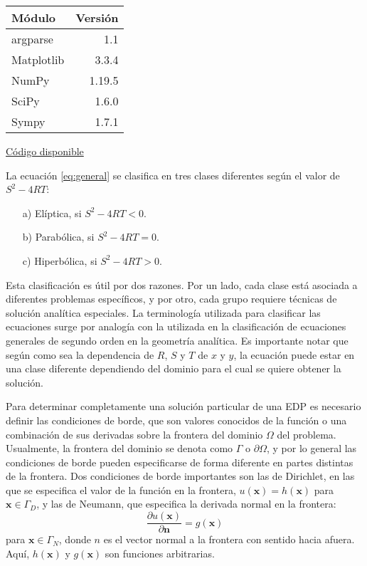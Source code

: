 \begin{wraptable}[12]{r}{5cm}
\begin{modulesinfo}
\begin{center}
{\small
    \begin{tabular}{l r}
        \toprule
        \textbf{Módulo} & \textbf{Versión} \\
        \midrule
        argparse & 1.1 \\
        Matplotlib & 3.3.4 \\
        NumPy & 1.19.5 \\
        SciPy & 1.6.0 \\
        Sympy & 1.7.1 \\
        \bottomrule
    \end{tabular}
    \vspace{0.75em}
    
    \href{https://github.com/facundobatista/libro-pyciencia/tree/master/código/ecuaciones_parciales/}{Código disponible}
}
\end{center}
\end{modulesinfo}
\end{wraptable}

La ecuación \eqref{eq:general} se clasifica en tres clases diferentes según el valor de $S^2-4RT$:
\begin{itemize}
 \item[a)] Elíptica, si $S^2-4RT < 0$.
 \item[b)] Parabólica, si $S^2-4RT = 0$.
 \item[c)] Hiperbólica, si $S^2-4RT > 0.$
\end{itemize}


Esta clasificación es útil por dos razones. Por un lado, cada clase está asociada a diferentes problemas específicos, y por otro, cada grupo requiere técnicas de solución analítica especiales. La terminología utilizada para clasificar las ecuaciones surge por analogía con la utilizada en la clasificación de ecuaciones generales de segundo orden en la geometría analítica. Es importante notar que según como sea la dependencia de $R$, $S$ y $T$ de $x$ y $y$, la ecuación puede estar en una clase diferente dependiendo del dominio para el cual se quiere obtener la solución.

Para determinar completamente una solución particular de una EDP es necesario definir las condiciones de borde, que son valores conocidos de la función o una combinación de sus derivadas sobre la frontera del dominio $\Omega$ del problema. Usualmente, la frontera del dominio se denota como $\Gamma$ o $\partial \Omega$, y por lo general las condiciones de borde pueden especificarse de forma diferente en partes distintas de la frontera. Dos condiciones de borde importantes son las de Dirichlet, en las que se especifica el valor de la función en la frontera, $u(\bm{x}) = h(\bm{x})$ para $\bm{x} \in \Gamma_D$, y las de Neumann, que especifica la derivada normal en la frontera:
\[ \frac{\partial u(\bm{x})}{\partial \bm{n}} = g(\bm{x}) \]
para $\bm{x} \in \Gamma_N$, donde $n$ es el vector normal a la frontera con sentido hacia afuera. Aquí, $h(\bm{x})$ y $g(\bm{x})$ son funciones arbitrarias.

